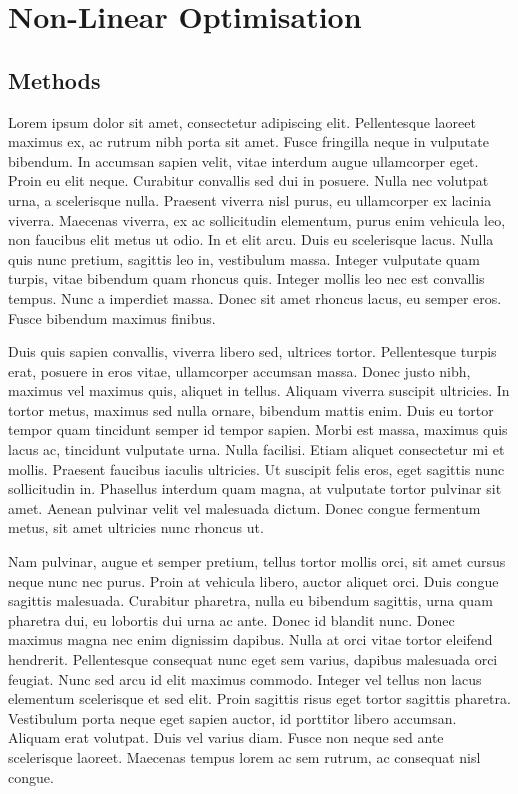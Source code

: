 \chapter{Non-Linear Optimisation}
\section{Methods}

Lorem ipsum dolor sit amet, consectetur adipiscing elit. Pellentesque laoreet maximus ex, ac rutrum nibh porta sit amet. Fusce fringilla neque in vulputate bibendum. In accumsan sapien velit, vitae interdum augue ullamcorper eget. Proin eu elit neque. Curabitur convallis sed dui in posuere. Nulla nec volutpat urna, a scelerisque nulla. Praesent viverra nisl purus, eu ullamcorper ex lacinia viverra. Maecenas viverra, ex ac sollicitudin elementum, purus enim vehicula leo, non faucibus elit metus ut odio. In et elit arcu. Duis eu scelerisque lacus. Nulla quis nunc pretium, sagittis leo in, vestibulum massa. Integer vulputate quam turpis, vitae bibendum quam rhoncus quis. Integer mollis leo nec est convallis tempus. Nunc a imperdiet massa. Donec sit amet rhoncus lacus, eu semper eros. Fusce bibendum maximus finibus.

Duis quis sapien convallis, viverra libero sed, ultrices tortor. Pellentesque turpis erat, posuere in eros vitae, ullamcorper accumsan massa. Donec justo nibh, maximus vel maximus quis, aliquet in tellus. Aliquam viverra suscipit ultricies. In tortor metus, maximus sed nulla ornare, bibendum mattis enim. Duis eu tortor tempor quam tincidunt semper id tempor sapien. Morbi est massa, maximus quis lacus ac, tincidunt vulputate urna. Nulla facilisi. Etiam aliquet consectetur mi et mollis. Praesent faucibus iaculis ultricies. Ut suscipit felis eros, eget sagittis nunc sollicitudin in. Phasellus interdum quam magna, at vulputate tortor pulvinar sit amet. Aenean pulvinar velit vel malesuada dictum. Donec congue fermentum metus, sit amet ultricies nunc rhoncus ut.

Nam pulvinar, augue et semper pretium, tellus tortor mollis orci, sit amet cursus neque nunc nec purus. Proin at vehicula libero, auctor aliquet orci. Duis congue sagittis malesuada. Curabitur pharetra, nulla eu bibendum sagittis, urna quam pharetra dui, eu lobortis dui urna ac ante. Donec id blandit nunc. Donec maximus magna nec enim dignissim dapibus. Nulla at orci vitae tortor eleifend hendrerit. Pellentesque consequat nunc eget sem varius, dapibus malesuada orci feugiat. Nunc sed arcu id elit maximus commodo. Integer vel tellus non lacus elementum scelerisque et sed elit. Proin sagittis risus eget tortor sagittis pharetra. Vestibulum porta neque eget sapien auctor, id porttitor libero accumsan. Aliquam erat volutpat. Duis vel varius diam. Fusce non neque sed ante scelerisque laoreet. Maecenas tempus lorem ac sem rutrum, ac consequat nisl congue.

